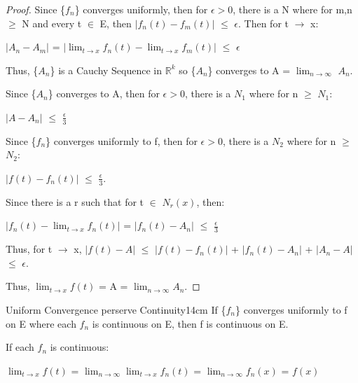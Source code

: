     \begin{proof}
        Since \{$f_n$\} converges uniformly, then for $\epsilon > 0$,
        there is a N where for m,n $\geq$ N and every t $\in$ E, then
        $|f_n(t) - f_m(t)|$ $\leq$ $\epsilon$.
        Then for t $\rightarrow$ x:

        \hspace{0.5cm}
        $|A_n - A_m|$
        = $|\lim_{t \rightarrow x} f_n(t) - \lim_{t \rightarrow x} f_m(t)|$
        $\leq$ $\epsilon$

        Thus, \{$A_n$\} is a Cauchy Sequence in $\mathbb{R}^k$ so \{$A_n$\}
        converges to A = $\lim_{n \rightarrow \infty}$ $A_n$.

        Since \{$A_n$\} converges to A, then for $\epsilon > 0$, there is a
        $N_1$ where for n $\geq$ $N_1$:

        \hspace{0.5cm}
        $|A - A_n|$ $\leq$ $\frac{\epsilon}{3}$

        Since \{$f_n$\} converges uniformly to f, then for $\epsilon > 0$,
        there is a $N_2$ where for n $\geq$ $N_2$:

        \hspace{0.5cm}
        $|f(t) - f_n(t)|$ $\leq$ $\frac{\epsilon}{3}$.

        Since there is a r such that for t $\in$ $N_r(x)$, then:

        \hspace{0.5cm}
        $|f_n(t) - \lim_{t \rightarrow x} f_n(t)|$
        = $|f_n(t) - A_n|$
        $\leq$ $\frac{\epsilon}{3}$

        Thus, for t $\rightarrow$ x, 
        $|f(t) - A|$
        $\leq$ $|f(t) - f_n(t)|$ + $|f_n(t) - A_n|$ + $|A_n - A|$
        $\leq$ $\epsilon$.

        Thus, $\lim_{t \rightarrow x} f(t)$ = A = $\lim_{n \rightarrow \infty} A_n$.
    \end{proof}

    \vspace{0.5cm}



    \begin{wtheorem}{Uniform Convergence perserve Continuity}{14cm}
        If \{$f_n$\} converges uniformly to f on E where each $f_n$
        is continuous on E, then f is continuous on E.        
    \end{wtheorem}

    \begin{intuition}
        If each $f_n$ is continuous:

        \hspace{0.5cm}
        $\lim_{t \rightarrow x} f(t)$
        = $\lim_{n \rightarrow \infty} \lim_{t \rightarrow x} f_n(t)$
        = $\lim_{n \rightarrow \infty} f_n(x)$
        = $f(x)$
    \end{intuition}

